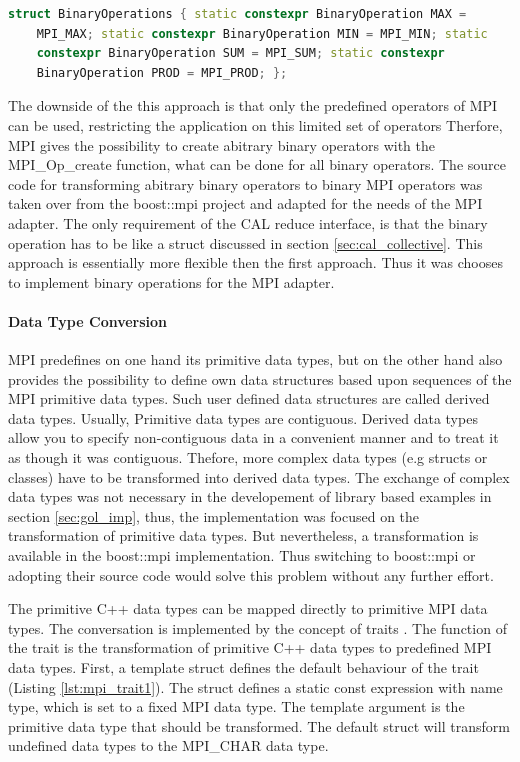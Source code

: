 \begin{lstlisting}[language=C++, caption={A small collection of binary operators by transformed MPI operations to static constexpression }, label=lst:mpi_bin]
  struct BinaryOperations { static constexpr BinaryOperation MAX =
    MPI_MAX; static constexpr BinaryOperation MIN = MPI_MIN; static
    constexpr BinaryOperation SUM = MPI_SUM; static constexpr
    BinaryOperation PROD = MPI_PROD; };
\end{lstlisting}

The downside of the this approach is that only the predefined
operators of MPI can be used, restricting the application on this
limited set of operators Therfore, MPI gives the possibility to create
abitrary binary operators with the MPI\_Op\_create function, what can
be done for all binary operators. The source code for transforming
abitrary binary operators to binary MPI operators was taken over from
the boost::mpi project and adapted for the needs of the MPI adapter.
The only requirement of the CAL reduce interface, is that the binary
operation has to be like a struct discussed in section
\ref{sec:cal_collective}. This approach is essentially more flexible
then the first approach. Thus it was chooses to implement binary
operations for the MPI adapter.

\paragraph*{Data Type Conversion}

MPI predefines on one hand its primitive data types, but on the other
hand also provides the possibility to define own data structures based
upon sequences of the MPI primitive data types. Such user defined data
structures are called derived data types. Usually, Primitive data
types are contiguous. Derived data types allow you to specify
non-contiguous data in a convenient manner and to treat it as though
it was contiguous.  Thefore, more complex data types (e.g structs or
classes) have to be transformed into derived data types. The exchange
of complex data types was not necessary in the developement of library
based examples in section \ref{sec:gol_imp}, thus, the implementation
was focused on the transformation of primitive data types.  But
nevertheless, a transformation is available in the boost::mpi
implementation. Thus switching to boost::mpi \cite{ref:boost::mpi} or
adopting their source code would solve this problem without any
further effort.

The primitive C++ data types can be mapped directly to primitive MPI
data types. The conversation is implemented by the concept of traits
\cite{ref:trait}.  The function of the trait is the transformation of
primitive C++ data types to predefined MPI data types.  First, a
template struct defines the default behaviour of the trait (Listing
\ref{lst:mpi_trait1}). The struct defines a static const expression
with name type, which is set to a fixed MPI data type. The template
argument is the primitive data type that should be transformed. The
default struct will transform undefined data types to the MPI\_CHAR
data type.

